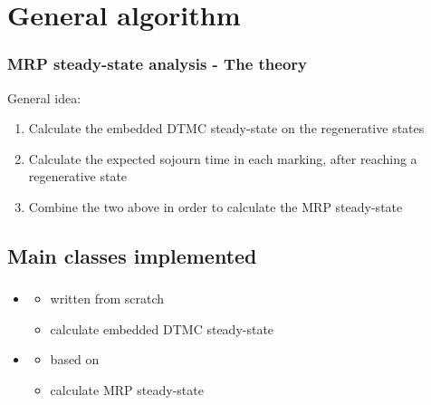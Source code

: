 \section{General algorithm}
\begin{frame}
  \frametitle{\acs{MRP} steady-state analysis - The theory}
  General idea:
  \begin{enumerate}
  \item<2-> Calculate the embedded \acs{DTMC} \alert{steady-state} on the
    regenerative states
  \item<3-> Calculate the expected \alert{sojourn time} in each marking, after
    reaching a regenerative state
  \item<4-> \alert{Combine} the two above in order to calculate the \acs{MRP} steady-state
  \end{enumerate}
  \begin{center}
  \end{center}
\end{frame}

\subsection{Main classes implemented}
\begin{frame}
  \frametitle{\insertsubsection}
  \begin{itemize}
	  \item {}
	  \pause
	  \begin{itemize}
	  	\item written from scratch
	  	\item calculate \alert{embedded \acs{DTMC}} steady-state
	  \end{itemize}
	  \pause
	  \item {}
	  \pause
	  \begin{itemize}
	  	\item based on 
	  	\item calculate \alert{\acs{MRP}} steady-state
	  \end{itemize}
  \end{itemize}
\end{frame}

